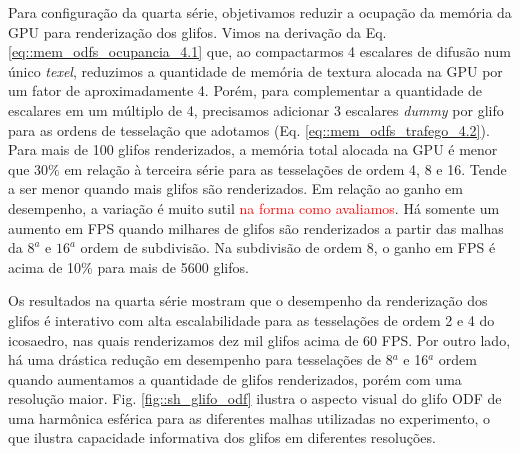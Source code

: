 Para configuração da quarta série, objetivamos reduzir a ocupação da memória da GPU para renderização dos glifos. Vimos na derivação da Eq. \ref{eq::mem_odfs_ocupancia_4.1} que, ao compactarmos 4 escalares de difusão num único \textit{texel}, reduzimos a quantidade de memória de textura alocada na GPU por um fator de aproximadamente 4. Porém, para complementar a quantidade de escalares em um múltiplo de 4, precisamos adicionar 3 escalares \textit{dummy} por glifo para as ordens de tesselação que adotamos (Eq. \ref{eq::mem_odfs_trafego_4.2}). Para mais de 100 glifos renderizados, a memória total alocada na GPU é menor que $30\%$ em relação à terceira série para as tesselações de ordem 4, 8 e 16. Tende a ser menor quando mais glifos são renderizados. Em relação ao ganho em desempenho, a variação é muito sutil \textcolor{red}{na forma como avaliamos}. Há somente um aumento em FPS quando milhares de glifos são renderizados a partir das malhas da $8^a$ e $16^a$ ordem de subdivisão. Na subdivisão de ordem 8, o ganho em FPS é acima de 10\% para mais de 5600 glifos. %


Os resultados na quarta série mostram que o desempenho da renderização dos glifos é interativo com alta escalabilidade para as tesselações de ordem 2 e 4 do icosaedro, nas quais renderizamos dez mil glifos acima de 60 FPS. Por outro lado, há uma drástica redução em desempenho para tesselações de 8$^a$ e 16$^a$ ordem quando aumentamos a quantidade de glifos renderizados, porém com uma resolução maior. Fig. \ref{fig::sh_glifo_odf} ilustra o aspecto visual do glifo ODF de uma harmônica esférica para as diferentes malhas utilizadas no experimento, o que ilustra capacidade informativa dos glifos em diferentes resoluções.

